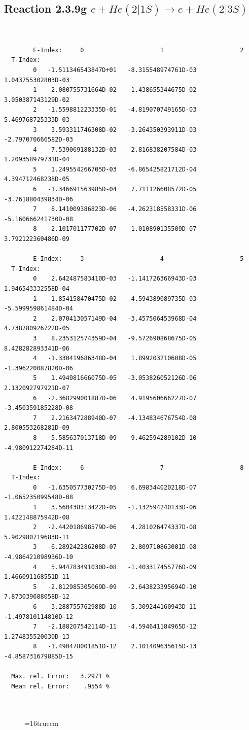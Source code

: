 \documentclass[12pt,dvips]{article}
\begin{document}
\subsection{
Reaction 2.3.9g $ e + He(2|1S) \rightarrow e + He(2|3S) $
}




\begin{small}\begin{verbatim}


        E-Index:     0                     1                     2
  T-Index:
        0   -1.511346543847D+01   -8.315548974761D-03    1.043755302803D-03
        1    2.080755731664D-02   -1.438655344675D-02    3.050387143129D-02
        2   -1.559881223335D-01   -4.819070749165D-03    5.469768725333D-03
        3    3.593311746308D-02   -3.264350393911D-03   -2.797070666582D-03
        4   -7.539069188132D-03    2.816838207584D-03    1.209358979731D-04
        5    1.249554266705D-03   -6.865425821712D-04    4.394712468238D-05
        6   -1.346691563985D-04    7.711126608572D-05   -3.761880439834D-06
        7    8.141009386823D-06   -4.262318558331D-06   -5.160666241730D-08
        8   -2.101701177702D-07    1.010890135509D-07    3.792122360486D-09

        E-Index:     3                     4                     5
  T-Index:
        0    2.642487583410D-03   -1.141726366943D-03    1.946543332558D-04
        1   -1.854158470475D-02    4.594389089735D-03   -5.599959861484D-04
        2    2.070413057149D-04   -3.457506453968D-04    4.738780926722D-05
        3    8.235312574359D-04   -9.572690868675D-05    8.428282893341D-06
        4   -1.330419686348D-04    1.899203210608D-05   -1.396220087820D-06
        5    1.494981666075D-05   -3.053826052126D-06    2.132092797921D-07
        6   -2.368299001887D-06    4.919560666227D-07   -3.450359185228D-08
        7    2.216347288940D-07   -4.134834676754D-08    2.800553268281D-09
        8   -5.585637013718D-09    9.462594289102D-10   -4.980912274284D-11

        E-Index:     6                     7                     8
  T-Index:
        0   -1.635057730275D-05    6.698344020218D-07   -1.065235099548D-08
        1    3.560438313422D-05   -1.132594240133D-06    1.422148875942D-08
        2   -2.442018698579D-06    4.281026474337D-08    5.902980719683D-11
        3   -6.289242286208D-07    2.809710863001D-08   -4.986421098936D-10
        4    5.944783491030D-08   -1.403317455776D-09    1.466091168551D-11
        5   -2.812985305069D-09   -2.643823395694D-10    7.873039688058D-12
        6    3.288755762988D-10    5.309244160943D-11   -1.497810114810D-12
        7   -2.188207542114D-11   -4.594641184965D-12    1.274835520030D-13
        8   -1.490478001851D-12    2.101409635615D-13   -4.858731679885D-15

  Max. rel. Error:   3.2971 %
  Mean rel. Error:    .9554 %



\end{verbatim}\end{small}
\begin{figure} \label{2.3.9g}
\epsfxsize=16truecm
\end{figure}
\newpage
\end{document}
